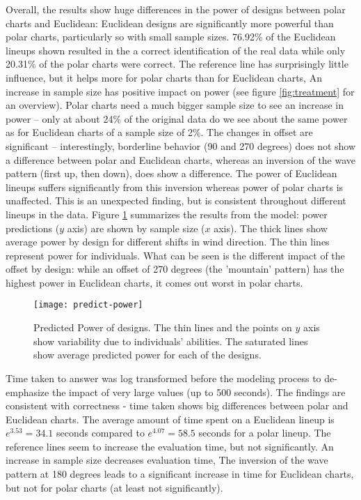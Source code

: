 Overall, the results show huge differences in the power of designs between polar charts and Euclidean: Euclidean designs are significantly more powerful than polar charts, particularly so with small sample sizes. 76.92\% of the Euclidean lineups shown resulted in the a correct identification of the real data while only 20.31\% of the polar charts were correct.
 The reference line has surprisingly little influence, but it helps more for  polar charts than for Euclidean charts,
An increase in sample size has positive impact on power (see figure \ref{fig:treatment} for an overview). Polar charts need a much bigger sample size to see an increase in power -- only at about 24\% of the original data do we see about the same power as for Euclidean charts of a sample size of 2\%.
The  changes in offset are significant -- interestingly, borderline behavior (90 and 270 degrees) does not show a difference between polar and Euclidean charts, whereas an inversion of the wave pattern (first up, then down), does show a difference. The power of Euclidean lineups suffers significantly  from this inversion whereas power of polar charts is unaffected. This is an unexpected finding, but is consistent throughout different lineups in the data. Figure \ref{fig:power} summarizes the results from the model: power predictions ($y$ axis) are shown by sample size ($x$ axis). The thick lines show average power by design for different shifts in wind direction. The thin lines represent power for individuals. What can be seen is the different impact of the offset by design: while  an offset of 270 degrees (the 'mountain' pattern) has the highest power in Euclidean charts, it comes out worst in polar charts.

\begin{figure}[htbp] %
   \centering
   \texttt{[image: predict-power]} 
   \caption{Predicted Power of designs.  The thin lines and the points on $y$ axis show  variability due to individuals' abilities. The saturated lines show average predicted power for each of the designs.}
   \label{fig:power}
\end{figure}

Time taken to answer was log transformed before the modeling process to de-emphasize the impact of very large values (up to 500 seconds). The findings are consistent with correctness - time taken shows big differences between polar and Euclidean charts. The average amount of time spent on a Euclidean lineup is $e^{3.53} = 34.1$ seconds compared to $e^{4.07}=58.5$ seconds for a polar lineup.
The reference lines seem to increase the evaluation time, but not significantly. An increase in sample size decreases evaluation time, The inversion of the wave pattern at 180 degrees leads to a significant increase in time for Euclidean charts, but not for polar charts (at least not significantly). 


